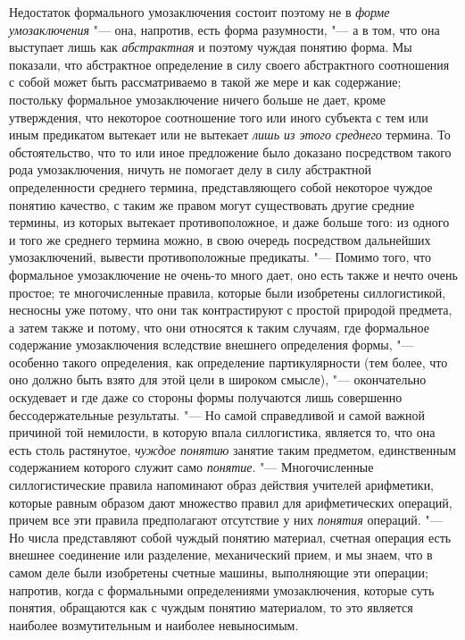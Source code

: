 Недостаток формального умозаключения состоит поэтому не в
{\em форме умозаключения}
"--- она, напротив, есть форма разумности, "--- а в
том, что она выступает лишь как
{\em абстрактная} и
поэтому чуждая понятию форма. Мы показали, что абстрактное определение в
силу своего абстрактного соотношения с собой может быть рассматриваемо в
такой же мере и как содержание; постольку формальное умозаключение ничего
больше не дает, кроме утверждения, что некоторое соотношение того или иного
субъекта с тем или иным предикатом вытекает или не вытекает
{\em лишь из этого среднего}
термина. То обстоятельство, что то или иное предложение было
доказано посредством такого рода умозаключения, ничуть не помогает делу в
силу абстрактной определенности среднего термина, представляющего собой
некоторое чуждое понятию качество, с таким же правом могут существовать
другие средние термины, из которых вытекает противоположное, и даже больше
того: из одного и того же среднего термина можно, в свою очередь
посредством дальнейших умозаключений, вывести противоположные предикаты. "---
Помимо того, что формальное умозаключение не очень-то много
дает, оно есть также и нечто очень простое; те многочисленные правила,
которые были изобретены силлогистикой, несносны уже потому, что они так
контрастируют с простой природой предмета, а затем также и потому, что они
относятся к таким случаям, где формальное содержание
умозаключения вследствие внешнего определения формы, "---
особенно такого определения, как определение партикулярности
(тем более, что оно должно быть взято для этой цели в широком смысле), "---
окончательно оскудевает и где даже со стороны формы
получаются лишь совершенно бессодержательные результаты. "---
Но самой справедливой и самой важной причиной той немилости,
в которую впала силлогистика, является то, что она есть столь растянутое,
{\em чуждое понятию}
занятие таким предметом, единственным содержанием которого
служит само {\em понятие}. "---
Многочисленные силлогистические правила напоминают образ
действия учителей арифметики, которые равным образом дают множество правил
для арифметических операций, причем все эти правила предполагают отсутствие
у них {\em понятия}
операций. "--- Но числа представляют собой чуждый
понятию материал, счетная операция есть внешнее соединение или разделение,
механический прием, и мы знаем, что в самом деле были изобретены счетные
машины, выполняющие эти операции; напротив, когда с формальными
определениями умозаключения, которые суть понятия, обращаются как с чуждым
понятию материалом, то это является наиболее возмутительным и наиболее
невыносимым.

